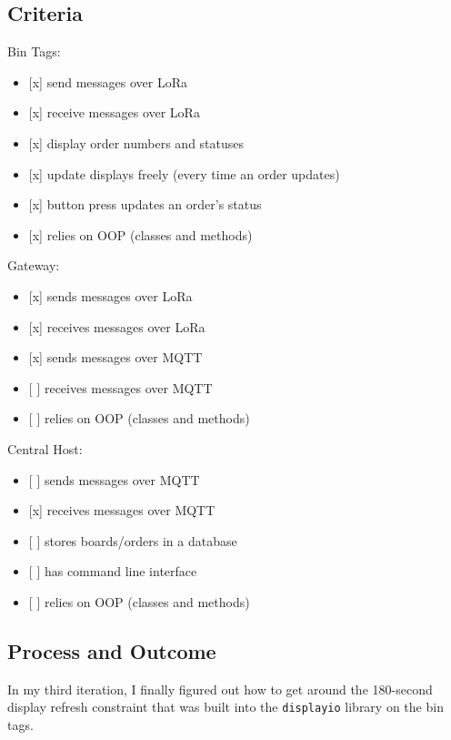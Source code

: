 \documentclass{article}
\begin{document}
\subsection{Criteria}\label{criteria-3}

Bin Tags:

\begin{itemize}
\item
  {[}x{]} send messages over LoRa
\item
  {[}x{]} receive messages over LoRa
\item
  {[}x{]} display order numbers and statuses
\item
  {[}x{]} update displays freely (every time an order updates)
\item
  {[}x{]} button press updates an order's status
\item
  {[}x{]} relies on OOP (classes and methods)
\end{itemize}

Gateway:

\begin{itemize}
\item
  {[}x{]} sends messages over LoRa
\item
  {[}x{]} receives messages over LoRa
\item
  {[}x{]} sends messages over MQTT
\item
  {[} {]} receives messages over MQTT
\item
  {[} {]} relies on OOP (classes and methods)
\end{itemize}

Central Host:

\begin{itemize}
\item
  {[} {]} sends messages over MQTT
\item
  {[}x{]} receives messages over MQTT
\item
  {[} {]} stores boards/orders in a database
\item
  {[} {]} has command line interface
\item
  {[} {]} relies on OOP (classes and methods)
\end{itemize}

\subsection{Process and Outcome}\label{process-and-outcome-2}

In my third iteration, I finally figured out how to get around the
180-second display refresh constraint that was built into the
\texttt{displayio} library on the bin tags.~
\end{document}
